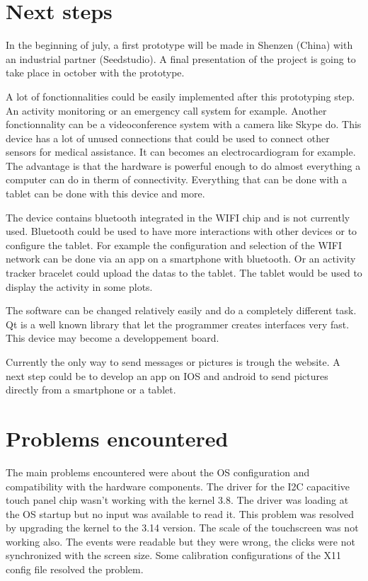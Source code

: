 \section{Next steps}

In the beginning of july, a first prototype will be made in Shenzen (China) with an industrial partner (Seedstudio). A final presentation of the project is going to take place in october with the prototype.

A lot of fonctionnalities could be easily implemented after this prototyping step. An activity monitoring or an emergency call system for example. Another fonctionnality can be a videoconference system with a camera like Skype do. This device has a lot of unused connections that could be used to connect other sensors for medical assistance. It can becomes an electrocardiogram for example. The advantage is that the hardware is powerful enough to do almost everything a computer can do in therm of connectivity. Everything that can be done with a tablet can be done with this device and more.

The device contains bluetooth integrated in the WIFI chip and is not currently used. Bluetooth could be used to have more interactions with other devices or to configure the tablet. For example the configuration and selection of the WIFI network can be done via an app on a smartphone with bluetooth. Or an activity tracker bracelet could upload the datas to the tablet. The tablet would be used to display the activity in some plots.

The software can be changed relatively easily and do a completely different task. Qt is a well known library that let the programmer creates interfaces very fast. This device may become a developpement board.

Currently the only way to send messages or pictures is trough the website. A next step could be to develop an app on IOS and android to send pictures directly from a smartphone or a tablet.

\section{Problems encountered}

The main problems encountered were about the OS configuration and compatibility with the hardware components. The driver for the I2C capacitive touch panel chip wasn't working with the kernel 3.8. The driver was loading at the OS startup but no input was available to read it. This problem was resolved by upgrading the kernel to the 3.14 version. The scale of the touchscreen was not working also. The events were readable but they were wrong, the clicks were not synchronized with the screen size. Some calibration configurations of the X11 config file resolved the problem.

